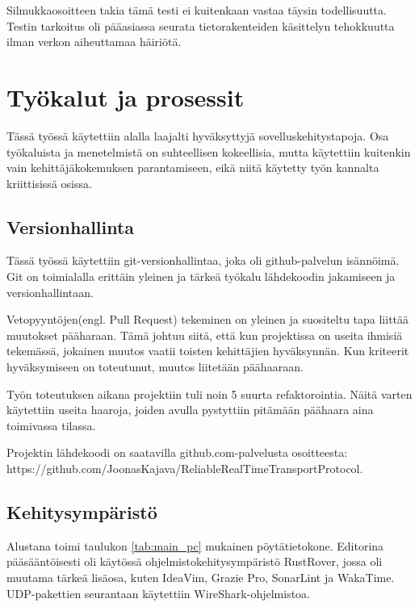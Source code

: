 \documentclass[a4paper,12pt]{article}
\begin{document}
Silmukkaosoitteen takia tämä testi ei kuitenkaan vastaa täysin todellisuutta.
Testin tarkoitus oli pääasiassa seurata tietorakenteiden käsittelyn tehokkuutta ilman
verkon aiheuttamaa häiriötä.


    \section{Työkalut ja prosessit}
    Tässä työssä käytettiin alalla laajalti hyväksyttyjä sovelluskehitystapoja. Osa työkaluista ja menetelmistä on suhteellisen kokeellisia, mutta käytettiin kuitenkin vain kehittäjäkokemuksen parantamiseen, eikä niitä käytetty työn kannalta kriittisissä osissa.

    \subsection{Versionhallinta}
    Tässä työssä käytettiin git-versionhallintaa, joka oli github-palvelun isännöimä. Git on toimialalla erittäin yleinen ja tärkeä työkalu lähdekoodin jakamiseen ja versionhallintaan. \par

    Vetopyyntöjen(engl. Pull Request) tekeminen on yleinen ja suositeltu tapa liittää muutokset pääharaan. Tämä johtuu siitä, että kun projektissa on useita ihmisiä tekemässä, jokainen muutos vaatii toisten kehittäjien hyväksynnän. Kun kriteerit hyväksymiseen on toteutunut,
    muutos liitetään päähaaraan.\par

    Työn toteutuksen aikana projektiin tuli noin 5 suurta refaktorointia.
    Näitä varten käytettiin useita haaroja, joiden avulla pystyttiin pitämään päähaara aina toimivassa tilassa. \par

    Projektin lähdekoodi on saatavilla github.com-palvelusta osoitteesta:
    https://github.com/JoonasKajava/ReliableRealTimeTransportProtocol.

    \subsection{Kehitysympäristö}


    Alustana toimi taulukon \ref{tab:main_pc} mukainen pöytätietokone.
    Editorina pääsääntöisesti oli käytössä ohjelmistokehitysympäristö RustRover, jossa oli muutama tärkeä lisäosa, kuten IdeaVim, Grazie Pro, SonarLint ja WakaTime.
    UDP-pakettien seurantaan käytettiin WireShark-ohjelmistoa.
\end{document}
